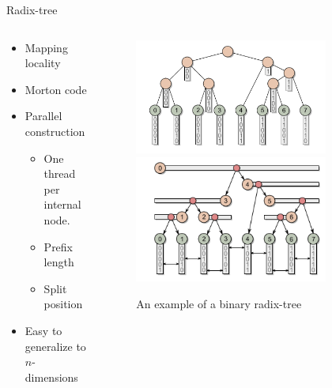 \begin{frame}{Radix-tree}
   \begin{columns}[T]
   \begin{column}{.48\textwidth}
      \begin{itemize}
          \item Mapping locality
          \item Morton code
          \item Parallel construction
          \begin{itemize}
              \item One thread per internal node.
              \item Prefix length
              \item Split position
          \end{itemize}
          \item Easy to generalize to $n$-dimensions
      \end{itemize}
   \end{column}
   \begin{column}{.48\textwidth}
   \begin{figure}
      \centering
      \includegraphics[width=0.8\textwidth]{../report/assests/radix.png}
      \includegraphics[width=0.8\textwidth]{../report/assests/radix-split.png}
      \caption{An example of a binary radix-tree}
      \label{fig:radix}
  \end{figure}
  \end{column}
  \end{columns}
\end{frame}{}

